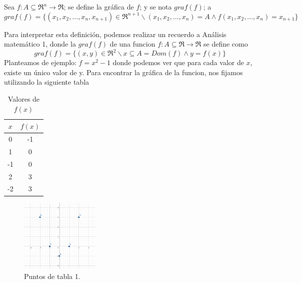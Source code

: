 
\begin{definition} [Grafica de $f$] 
\label{def:grafica}
 \mbox{}
 
Sea $f: A\subseteq\Re^n\rightarrow\Re$; se define la gráfica de $f$; y se nota $graf(f)$; a
 \[
graf(f)=\{(x_1,x_2,...,x_n,x_{n+1})\in\Re^{n+1} \backslash (x_1,x_2,...,x_n)=A \land f(x_1,x_2,...,x_n)=x_{n+1} \}
 \]

Para interpretar esta definición, podemos realizar un recuerdo a Análisis matemático 1, donde la $graf (f)$ de una funcion $f: A\subseteq\Re\rightarrow\Re$ se define como
 \[
graf(f)=\{(x,y)\in\Re^2 \backslash x\subseteq A=Dom(f) \land y=f(x) \}
 \]
Planteamos de ejemplo: $f=x^2-1$ donde podemos ver que para cada valor de $x$, existe un único valor de y. Para encontrar la gráfica de la funcion, nos fijamos utilizando la siguiente tabla
\begin{table}[h!]
\centering
\begin{tabular}{|c|c|}
\hline
\textbf{$x$} & \textbf{$f(x)$}  \\ \hline
0             & -1                         \\ \hline
1             & 0                        \\ \hline
-1             & 0                          \\ \hline
2             & 3                          \\ \hline
-2             & 3                          \\ \hline
\end{tabular}
\caption{Valores de $f(x)$}
\label{tabla1}
\end{table}
\begin{figure}[h!] %
    \centering
    \includegraphics[width=0.34\textwidth]{../figs/Puntos_grafica.png} %
    \caption{Puntos de tabla 1.}
    \label{fig:ejemplo1} %
\end{figure}



\end{definition}
